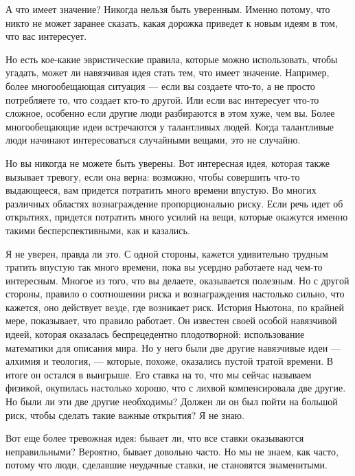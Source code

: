 \documentclass[ebook,12pt,oneside,openany]{memoir}
\begin{document}
А что имеет значение? Никогда нельзя быть уверенным. Именно потому,
что никто не может заранее сказать, какая дорожка приведет к новым
идеям в том, что вас интересует. \newline

Но есть кое-какие эвристические правила, которые можно использовать,
чтобы угадать, может ли навязчивая идея стать тем, что имеет значение.
Например, более многообещающая ситуация — если вы создаете что-то, а
не просто потребляете то, что создает кто-то другой. Или если вас
интересует что-то сложное, особенно если другие люди разбираются в
этом хуже, чем вы. Более многообещающие идеи встречаются у талантливых
людей. Когда талантливые люди начинают интересоваться случайными
вещами, это не случайно. \newline

Но вы никогда не можете быть уверены. Вот интересная идея, которая
также вызывает тревогу, если она верна: возможно, чтобы совершить
что-то выдающееся, вам придется потратить много времени впустую. Во
многих различных областях вознаграждение пропорционально риску. Если
речь идет об открытиях, придется потратить много усилий на вещи,
которые окажутся именно такими бесперспективными, как и казались. \newline

Я не уверен, правда ли это. С одной стороны, кажется удивительно
трудным тратить впустую так много времени, пока вы усердно работаете
над чем-то интересным. Многое из того, что вы делаете, оказывается
полезным. Но с другой стороны, правило о соотношении риска и
вознаграждения настолько сильно, что кажется, оно действует везде, где
возникает риск. История Ньютона, по крайней мере, показывает, что
правило работает. Он известен своей особой навязчивой идеей, которая
оказалась беспрецедентно плодотворной: использование математики для
описания мира. Но у него были две другие навязчивые идеи — алхимия и
теология, — которые, похоже, оказались пустой тратой времени. В итоге
он остался в выигрыше. Его ставка на то, что мы сейчас называем
физикой, окупилась настолько хорошо, что с лихвой компенсировала две
другие. Но были ли эти две другие необходимы? Должен ли он был пойти
на большой риск, чтобы сделать такие важные открытия? Я не знаю. \newline

Вот еще более тревожная идея: бывает ли, что все ставки оказываются
неправильными? Вероятно, бывает довольно часто. Но мы не знаем, как
часто, потому что люди, сделавшие неудачные ставки, не становятся
знаменитыми. \newline
\end{document}
